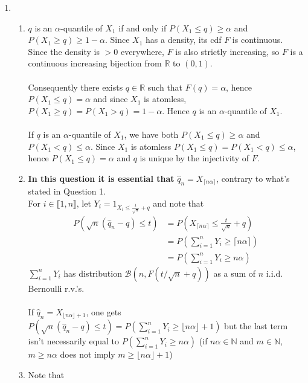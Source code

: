 \documentclass[a4paper,11pt]{article}
\begin{document}
\begin{enumerate}
  \item
  \begin{enumerate}
    \item $q$ is an $\alpha$-quantile of $X_1$ if and only if $P(X_1\leq q)\geq \alpha$ and $P(X_1\geq q)\geq 1-\alpha$. Since $X_1$ has a density, its cdf $F$ is continuous. Since the density is $>0$ everywhere, $F$ is also strictly increasing, so $F$ is a continuous increasing bijection from $\mathbb R$ to $(0,1)$.\\
    \\
    Consequently there exists $q\in \mathbb R$ such that $F(q)=\alpha$, hence $P(X_1\leq q)=\alpha$ and since $X_1$ is atomless, $P(X_1\geq q) = P(X_1> q)=1 -\alpha$. Hence $q$ is an $\alpha$-quantile of $X_1$.\\\\
    If $q$ is an $\alpha$-quantile of $X_1$, we have both $P(X_1\leq q)\geq \alpha$ and $P(X_1< q)\leq \alpha$. Since $X_1$ is atomless $P(X_1\leq q)=P(X_1<q)\leq \alpha$, hence $P(X_1\leq q)= \alpha$ and $q$ is unique by the injectivity of $F$.
    \\
    \item \textbf{In this question it is essential that} $\hat q_n = X_{\lceil n\alpha \rceil}$, contrary to what's stated in Question 1.\\
    For $i\in \llbracket 1,n \rrbracket$, let $\displaystyle Y_i = 1_{X_{i} \leq \frac t{\sqrt n} +q}$ and note that $$
    \begin{aligned}
    P(\sqrt{n}\left(\hat{q}_{n}-q\right) \leq t)  
    &= P(X_{\lceil n\alpha \rceil} \leq \frac t{\sqrt n} +q)\\
    &= P(\sum_{i=1}^n Y_i \geq \lceil n\alpha \rceil)\\
    &= P(\sum_{i=1}^n Y_i \geq n\alpha)
    \end{aligned}$$
    $\sum_{i=1}^n Y_i$ has distribution $\mathcal B(n, F(t/\sqrt n + q))$ as a sum of $n$ i.i.d. Bernoulli r.v.'s.\\\\
    If $\hat q_n = X_{\lfloor n\alpha \rfloor+1}$, one gets $P(\sqrt{n}\left(\hat{q}_{n}-q\right) \leq t) = P(\sum_{i=1}^n Y_i \geq \lfloor n\alpha \rfloor+1)$ but the last term isn't necessarily equal to $P(\sum_{i=1}^n Y_i \geq n\alpha)$ (if $n\alpha\in \mathbb N$ and $m\in \mathbb N$, $m\geq n\alpha$ does not imply $m\geq \lfloor n\alpha \rfloor+1$)
    \\
    \item Note that 
    $$\begin{aligned}

\end{aligned}$$
\end{enumerate}
\end{enumerate}
\end{document}

